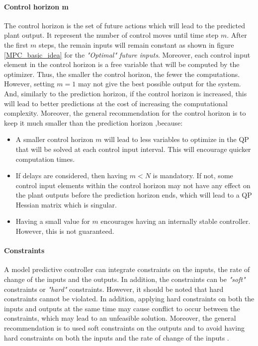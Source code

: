 \documentclass{thesisreport}
\begin{document}
\paragraph{Control horizon m}

The control horizon is the set of future actions which will lead to the predicted plant output. It represent the number of control moves until time step $m$. After the first $m$ steps, the remain inputs will remain constant as shown in figure \ref{MPC_basic_idea} for the \textit{"Optimal" future inputs}. Moreover, each control input element in the control horizon is a free variable that will be computed by the optimizer. Thus, the smaller the control horizon, the fewer the computations. However, setting $m=1$ may not give the best possible output for the system. And, similarly to the prediction horizon, if the control horizon is increased, this will lead to better predictions at the cost of increasing the computational complexity. Moreover, the general recommendation for the control horizon is to keep it much smaller than the prediction horizon \cite{MathWorks2018},because:

\begin{itemize}
	\item A smaller control horizon $m$ will lead to less variables to optimize in the QP that will be solved at each control input interval. This will encourage quicker computation times.
	\item If delays are considered, then having $m<N$ is mandatory. If not, some control input elements within the control horizon  may not have any effect on the plant outputs before the prediction horizon ends, which will lead to a QP Hessian matrix which is singular. 
	\item Having a small value for $m$ encourages having an internally stable controller. However, this is not guaranteed.
\end{itemize}

\paragraph{Constraints} A model predictive controller can integrate constraints on the inputs, the rate of change of the inputs and the outputs. In addition, the constraints can be \textit{"soft"} constraints or \textit{"hard"} constraints. However, it should be noted that hard constraints cannot be violated. In addition, applying hard constraints on both the inputs and outputs at the same time may cause conflict to occur between the constraints, which may lead to an unfeasible solution. Moreover, the general recommendation is to used soft constraints on the outputs and to avoid having hard constraints on both the inputs and the rate of change of the inputs \cite{MathWorks2018b}.
\end{document}
